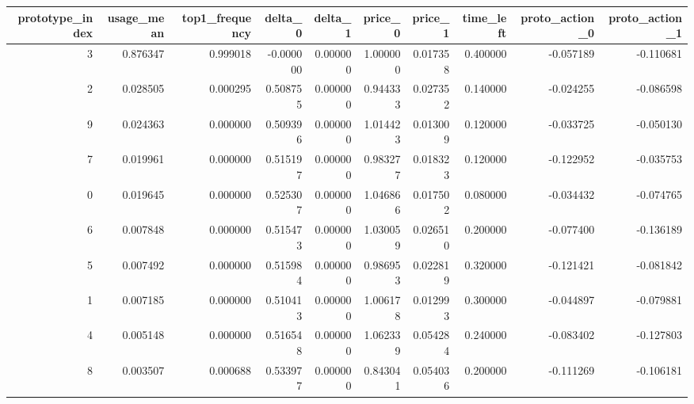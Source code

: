\begin{tabular}{rrrrrrrrrr}
\toprule
prototype_index & usage_mean & top1_frequency & delta_0 & delta_1 & price_0 & price_1 & time_left & proto_action_0 & proto_action_1 \\
\midrule
3 & 0.876347 & 0.999018 & -0.000000 & 0.000000 & 1.000000 & 0.017358 & 0.400000 & -0.057189 & -0.110681 \\
2 & 0.028505 & 0.000295 & 0.508755 & 0.000000 & 0.944333 & 0.027352 & 0.140000 & -0.024255 & -0.086598 \\
9 & 0.024363 & 0.000000 & 0.509396 & 0.000000 & 1.014423 & 0.013009 & 0.120000 & -0.033725 & -0.050130 \\
7 & 0.019961 & 0.000000 & 0.515197 & 0.000000 & 0.983277 & 0.018323 & 0.120000 & -0.122952 & -0.035753 \\
0 & 0.019645 & 0.000000 & 0.525307 & 0.000000 & 1.046866 & 0.017502 & 0.080000 & -0.034432 & -0.074765 \\
6 & 0.007848 & 0.000000 & 0.515473 & 0.000000 & 1.030059 & 0.026510 & 0.200000 & -0.077400 & -0.136189 \\
5 & 0.007492 & 0.000000 & 0.515984 & 0.000000 & 0.986953 & 0.022819 & 0.320000 & -0.121421 & -0.081842 \\
1 & 0.007185 & 0.000000 & 0.510413 & 0.000000 & 1.006178 & 0.012993 & 0.300000 & -0.044897 & -0.079881 \\
4 & 0.005148 & 0.000000 & 0.516548 & 0.000000 & 1.062339 & 0.054284 & 0.240000 & -0.083402 & -0.127803 \\
8 & 0.003507 & 0.000688 & 0.533977 & 0.000000 & 0.843041 & 0.054036 & 0.200000 & -0.111269 & -0.106181 \\
\bottomrule
\end{tabular}
